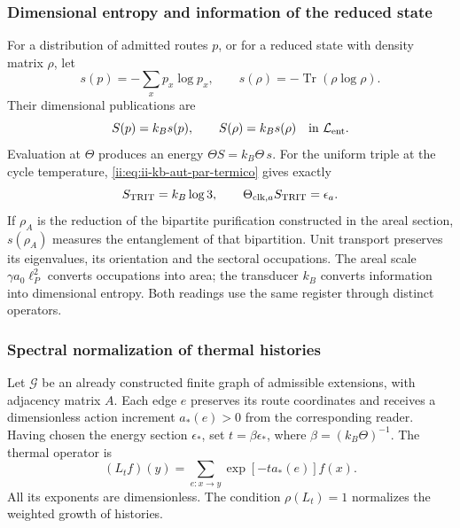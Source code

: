 \subsubsection{Dimensional entropy and information of the reduced state}

For a distribution of admitted routes \(p\), or for a reduced
state with density matrix \(\rho\), let
\[
 s(p)=-\sum_xp_x\log p_x,\qquad
 s(\rho)=-\operatorname{Tr}(\rho\log\rho).
\]
Their dimensional publications are
\begin{equation}
 S(p)=k_Bs(p),\qquad S(\rho)=k_Bs(\rho)
 \quad\text{in }\mathcal L_{\rm ent}.
 \label{ii:eq:ii-kb-aut-entropia}
\end{equation}
Evaluation at \(\Theta\) produces an energy
\(\Theta S=k_B\Theta\,s\). For the uniform triple at the cycle
temperature, \eqref{ii:eq:ii-kb-aut-par-termico} gives exactly
\[
 S_{\rm TRIT}=k_B\log3,\qquad
 \Theta_{{\rm clk},a}S_{\rm TRIT}=\epsilon_a.
\]
If \(\rho_A\) is the reduction of the bipartite purification
constructed in the areal section, \(s(\rho_A)\) measures the entanglement
of that bipartition. Unit transport preserves its
eigenvalues, its orientation and the sectoral occupations. The areal
scale \(\gamma a_0\ell_P^2\) converts occupations into area; the
transducer \(k_B\) converts information into dimensional entropy.
Both readings use the same register through distinct operators.

\subsubsection{Spectral normalization of thermal histories}

Let \(\mathcal G\) be an already constructed finite graph of admissible
extensions, with adjacency matrix \(A\). Each edge \(e\) preserves
its route coordinates and receives a dimensionless action increment
\(a_*(e)>0\) from the corresponding reader. Having chosen the energy section
\(\epsilon_*\), set \(t=\beta\epsilon_*\), where
\(\beta=(k_B\Theta)^{-1}\). The thermal operator is
\begin{equation}
 (L_tf)(y)=\sum_{e:x\to y}\exp[-t a_*(e)]f(x).
 \label{ii:eq:ii-kb-aut-operador}
\end{equation}
All its exponents are dimensionless. The condition
\(\rho(L_t)=1\) normalizes the weighted growth of histories.

